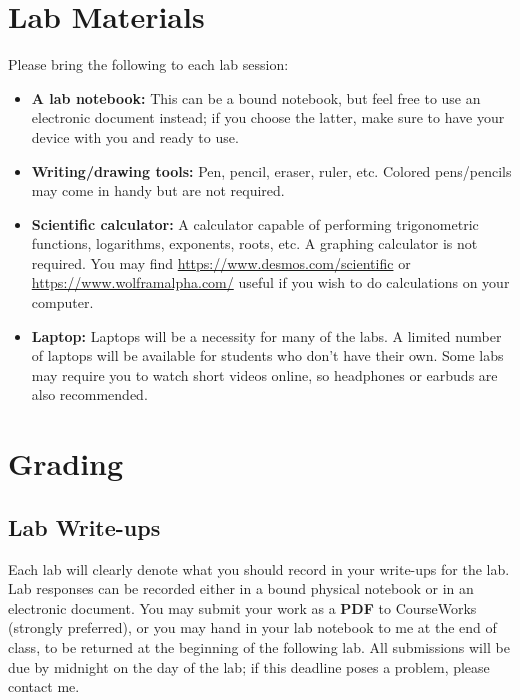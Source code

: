 \documentclass[11pt]{article}
\begin{document}
\section*{Lab Materials}
 
Please bring the following to each lab session:
 
\begin{itemize}
\item \textbf{A lab notebook:} This can be a bound notebook, but feel free to use an electronic document instead; if you choose the latter, make sure to have your device with you and ready to use.  
\item \textbf{Writing/drawing tools:} Pen, pencil, eraser, ruler, etc. Colored pens/pencils may come in handy but are not required.
\item \textbf{Scientific calculator:}  A calculator capable of performing trigonometric functions, logarithms, exponents, roots, etc. A graphing calculator is not required. You may find \url{https://www.desmos.com/scientific} or \url{https://www.wolframalpha.com/} useful if you wish to do calculations on your computer. 
\item \textbf{Laptop:} Laptops will be a necessity for many of the labs.  A limited number of laptops will be available for students who don't have their own. Some labs may require you to watch short videos online, so headphones or earbuds are also recommended. \\
\end{itemize}

\section*{Grading}

\subsection*{Lab Write-ups}
Each lab will clearly denote what you should record in your write-ups for the lab. Lab responses can be recorded either in a bound physical notebook or in an electronic document. You may submit your work as a \textbf{PDF} to CourseWorks (strongly preferred), or you may hand in your lab notebook to me at the end of class, to be returned at the beginning of the following lab. All submissions will be due by midnight on the day of the lab; if this deadline poses a problem, please contact me.
\end{document}
